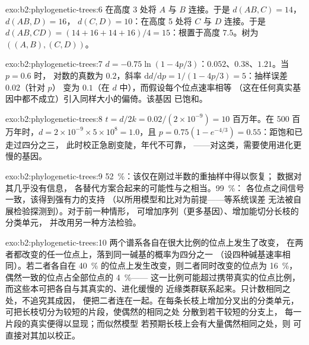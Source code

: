 \begin{solution}{exo:b2:phylogenetic-trees:6}
在高度 3 处将 $A$ 与 $B$ 连接。于是 $d(AB,C) = 14$，$d(AB,D) = 16$，
$d(C,D) = 10$：在高度 5 处将 $C$ 与 $D$ 连接。于是 $d(AB,CD) = (14 + 16
+ 14 + 16)/4 = 15$：根置于高度 $7.5$。树为 $((A,B),(C,D))$。
\end{solution}

\begin{solution}{exo:b2:phylogenetic-trees:7}
$d = -0.75\ln(1 - 4p/3)$：$0.052$、$0.38$、$1.21$。当 $p = 0.6$ 时，
对数的真数为 $0.2$，斜率 $\mathrm{d}d/\mathrm{d}p
= 1/(1 - 4p/3) = 5$：抽样误差 $0.02$（针对 $p$）
变为 $0.1$（在 $d$ 中），而假设每个位点速率相等
（这在任何真实基因中都不成立）引入同样大小的偏倚。该基因
已饱和。
\end{solution}

\begin{solution}{exo:b2:phylogenetic-trees:8}
$t = d/2k = 0.02/(2\times 10^{-9}) = 10$ 百万年。在 500
百万年时，$d = 2\times 10^{-9}\times 5\times 10^{8} = 1.0$，且
$p = 0.75(1 - e^{-4/3}) = 0.55$：距饱和已走过四分之三，
此时校正急剧变陡，年代不可靠，
——对这类，需要使用进化更慢的基因。
\end{solution}

\begin{solution}{exo:b2:phylogenetic-trees:9}
\qty{52}{\%}：该仅在刚过半数的重抽样中得以恢复；
数据对其几乎没有信息，
各替代方案合起来的可能性与之相当。\qty{99}{\%}：
各位点之间信号一致，该得到强有力的支持
（以所用模型和比对为前提——等系统误差
无法被自展检验探测到）。对于前一种情形，
可增加序列（更多基因）、增加能切分长枝的分类单元，
并改用另一种方法检验。
\end{solution}

\begin{solution}{exo:b2:phylogenetic-trees:10}
两个谱系各自在很大比例的位点上发生了改变，
在两者都改变的任一位点上，落到同一碱基的概率为四分之一
（设四种碱基速率相同）。若二者各自在
\qty{40}{\%} 的位点上发生改变，则二者同时改变的位点为
\qty{16}{\%}，偶然一致的位点占全部位点的 \qty{4}{\%}——
这一比例可能超过携带真实的位点比例，
而这些本可把各自与其真实的、进化缓慢的
近缘类群联系起来。只计数相同之处，不追究其成因，
便把二者连在一起。在每条长枝上增加分叉出的分类单元，
可把长枝切分为较短的片段，使偶然的相同之处
分散到若干较短的分支上，
每一片段的真实便得以显现；而似然模型
若预期长枝上会有大量偶然相同之处，则
可直接对其加以校正。
\end{solution}

